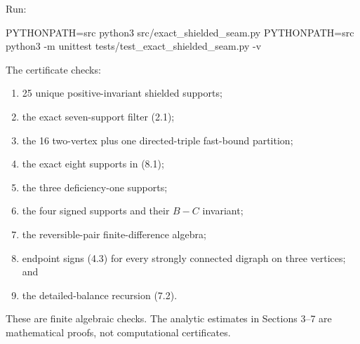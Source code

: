 Run:

\begin{CodeBlock}
PYTHONPATH=src python3 src/exact_shielded_seam.py
PYTHONPATH=src python3 -m unittest tests/test_exact_shielded_seam.py -v
\end{CodeBlock}

The certificate checks:

\begin{enumerate}
\def\labelenumi{\arabic{enumi}.}
\tightlist
\item
  25 unique positive-invariant shielded supports;
\item
  the exact seven-support filter (2.1);
\item
  the 16 two-vertex plus one directed-triple fast-bound partition;
\item
  the exact eight supports in (8.1);
\item
  the three deficiency-one supports;
\item
  the four signed supports and their \(B-C\) invariant;
\item
  the reversible-pair finite-difference algebra;
\item
  endpoint signs (4.3) for every strongly connected digraph on three
  vertices; and
\item
  the detailed-balance recursion (7.2).
\end{enumerate}

These are finite algebraic checks. The analytic estimates in Sections
3--7 are mathematical proofs, not computational certificates.
